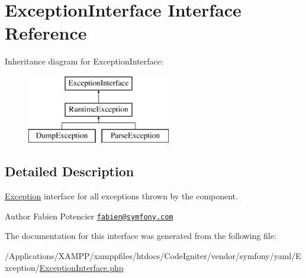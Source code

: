 \hypertarget{interface_symfony_1_1_component_1_1_yaml_1_1_exception_1_1_exception_interface}{}\section{Exception\+Interface Interface Reference}
\label{interface_symfony_1_1_component_1_1_yaml_1_1_exception_1_1_exception_interface}
Inheritance diagram for Exception\+Interface\+:\begin{figure}[H]
\begin{center}
\leavevmode
\includegraphics[height=3.000000cm]{interface_symfony_1_1_component_1_1_yaml_1_1_exception_1_1_exception_interface}
\end{center}
\end{figure}


\subsection{Detailed Description}
\mbox{\hyperlink{namespace_symfony_1_1_component_1_1_yaml_1_1_exception}{Exception}} interface for all exceptions thrown by the component.

\begin{DoxyAuthor}{Author}
Fabien Potencier \href{mailto:fabien@symfony.com}{\tt fabien@symfony.\+com} 
\end{DoxyAuthor}


The documentation for this interface was generated from the following file\+:\begin{DoxyCompactItemize}
\item 
/\+Applications/\+X\+A\+M\+P\+P/xamppfiles/htdocs/\+Code\+Igniter/vendor/symfony/yaml/\+Exception/\mbox{\hyperlink{symfony_2yaml_2_exception_2_exception_interface_8php}{Exception\+Interface.\+php}}\end{DoxyCompactItemize}
